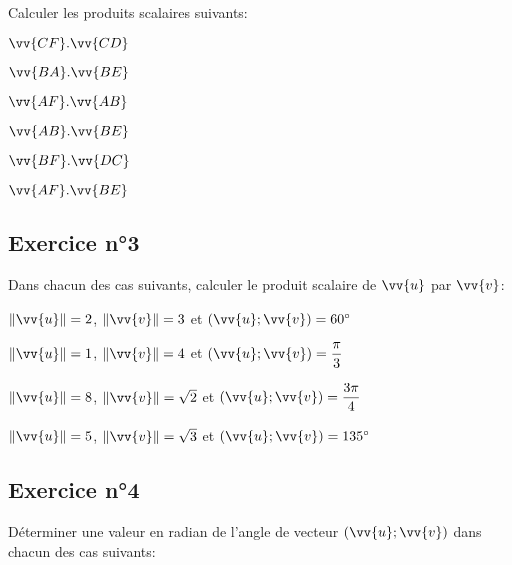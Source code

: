 \documentclass[12pt,a4paper]{article}
\begin{document}
Calculer les produits scalaires suivants:


\begin{enumerate}
\begin{minipage}[t]{0.4\linewidth}
\item $\vv{CF}.\vv{CD}$
\item $\vv{BA}.\vv{BE}$
\end{minipage}
\begin{minipage}[t]{0.4\linewidth}
\item $\vv{AF}.\vv{AB}$
\item $\vv{AB}.\vv{BE}$
\end{minipage}
\begin{minipage}[t]{0.4\linewidth}
\item $\vv{BF}.\vv{DC}$
\item $\vv{AF}.\vv{BE}$
\end{minipage}

\end{enumerate}

\subsection*{Exercice n°3}

Dans chacun des cas suivants, calculer le produit scalaire de $\vv{u}$ par $\vv{v}$:

\begin{enumerate}
\begin{minipage}[t]{0.5\linewidth}
\item $\norme{\vv{u}}=2$, $\norme{\vv{v}}=3$ et $(\vv{u};\vv{v})=60^\circ $
\item $\norme{\vv{u}}=1$, $\norme{\vv{v}}=4$ et $(\vv{u};\vv{v})=\dfrac{\pi}{3} $
\end{minipage}
\begin{minipage}[t]{0.5\linewidth}
\item $\norme{\vv{u}}=8$, $\norme{\vv{v}}=\sqrt{2}$ et $(\vv{u};\vv{v})=\dfrac{3\pi}{4} $
\item $\norme{\vv{u}}=5$, $\norme{\vv{v}}=\sqrt{3}$ et $(\vv{u};\vv{v})=135^\circ $
\end{minipage}
\end{enumerate}


\subsection*{Exercice n°4}

Déterminer une valeur en radian de l'angle de vecteur $(\vv{u};\vv{v})$ dans chacun des cas suivants:
\end{document}
